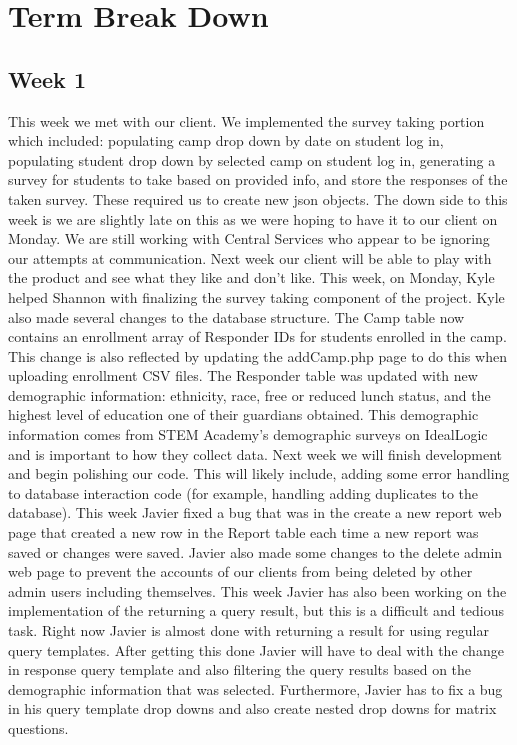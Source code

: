 \documentclass[letterpaper,10pt,serif,draftclsnofoot,onecolumn,compsoc,titlepage]{IEEEtran}
\begin{document}
\section{Term Break Down}
\subsection{Week 1}
This week we met with our client. We implemented the survey taking portion which included: 
populating camp drop down by date on student log in,
populating student drop down by selected camp on student log in,
generating a survey for students to take based on provided info, and
store the responses of the taken survey. These required us to create new json objects. 
The down side to this week is we are slightly late on this as we were hoping to have it to our client on Monday.
 We are still working with Central Services who appear to be ignoring our attempts at communication.
 Next week our client will be able to play with the product and see what they like and don't like.
 This week, on Monday, Kyle helped Shannon with finalizing the survey taking component of the project.
Kyle also made several changes to the database structure. The Camp table now contains an enrollment array
 of Responder IDs for students enrolled in the camp. This change is also reflected by updating the
 addCamp.php page to do this when uploading enrollment CSV files. The Responder table was updated
 with new demographic information: ethnicity, race, free or reduced lunch status, and the highest
 level of education one of their guardians obtained. This demographic information comes from STEM Academy's
 demographic surveys on IdealLogic and is important to how they collect data.
Next week we will finish development and begin polishing our code. This will likely include,
 adding some error handling to database interaction code (for example, handling adding 
 duplicates to the database).
This week Javier fixed a bug that was in the create a new report web page that created a new row in 
the Report table each time a new report was saved or changes were saved. Javier also made some changes
 to the delete admin web page to prevent the accounts of our clients from being deleted by other admin
 users including themselves. This week Javier has also been working on the implementation of the returning
 a query result, but this is a difficult and tedious task. Right now Javier is almost done with returning
 a result for using regular query templates. After getting this done Javier will have to deal with the
 change in response query template and also filtering the query results based on the demographic
 information that was selected. Furthermore, Javier has to fix a bug in his query template drop downs
 and also create nested drop downs for matrix questions. 
\end{document}
